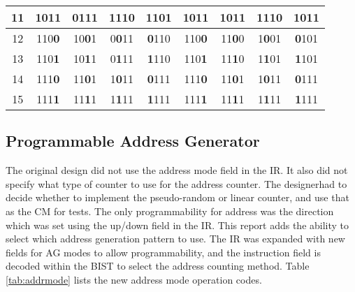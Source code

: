 \begin{table}[H]
\begin{tabular}{|c||c|c|c|c||c|c|c|c|}
  11 & 101\textbf{1} & 01\textbf{1}1 & 1\textbf{1}10 & \textbf{1}101 & 101\textbf{1} & 10\textbf{1}1 & 1\textbf{1}10 & \textbf{1}011 \\  
  \hline                                                                           
  12 & 110\textbf{0} & 10\textbf{0}1 & 0\textbf{0}11 & \textbf{0}110 & 110\textbf{0} & 11\textbf{0}0 & 1\textbf{0}01 & \textbf{0}101 \\  
  13 & 110\textbf{1} & 10\textbf{1}1 & 0\textbf{1}11 & \textbf{1}110 & 110\textbf{1} & 11\textbf{1}0 & 1\textbf{1}01 & \textbf{1}101 \\  
  14 & 111\textbf{0} & 11\textbf{0}1 & 1\textbf{0}11 & \textbf{0}111 & 111\textbf{0} & 11\textbf{0}1 & 1\textbf{0}11 & \textbf{0}111 \\  
  15 & 111\textbf{1} & 11\textbf{1}1 & 1\textbf{1}11 & \textbf{1}111 & 111\textbf{1} & 11\textbf{1}1 & 1\textbf{1}11 & \textbf{1}111 \\  
  \hline
  \end{tabular}
  \label{tab:2i}
\end{table}

\subsection{Programmable Address Generator}
The original design did not use the address mode field in the IR.  It also did not specify what type of counter to use for the address counter.  The designerhad to decide whether to implement the pseudo-random or linear counter, and use that as the CM for tests.  The only programmability for address was the direction which was set using the up/down field in the IR.  This report adds the ability to select which address generation pattern to use.  The IR was expanded with new fields for AG modes to allow programmability, and the instruction field is decoded within the BIST to select the address counting method.  Table \ref{tab:addrmode} lists the new address mode operation codes.

